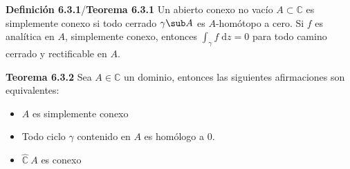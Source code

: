 \documentclass[a4paper, 11pt]{extarticle}
\newcommand{\tma}[1]{\textcolor{rojo}{\textbf{Teorema #1}}}
\newcommand{\defi}[1]{\textcolor{azul}{\textbf{Definición #1}}}
\begin{document}
\begin{multicols*}{2}
\defi{6.3.1}/\tma{6.3.1} Un abierto conexo no vacío \(A \subset \mathbb{C}\) es
simplemente conexo si todo cerrado \(\gamma \sub A\) es \(A\)-homótopo a
cero.
Si \(f\) es analítica en \(A\), simplemente conexo, entonces \(\int _\gamma
f \; \text{d} z = 0\) para todo camino cerrado y rectificable en \(A\).

\tma{6.3.2} Sea \(A \in \mathbb{C}\) un dominio, entonces las siguientes
afirmaciones son equivalentes:
\vspace{-1em}
\begin{itemize}
\item \(A\) es simplemente conexo
\item Todo ciclo \(\gamma\) contenido en \(A\) es homólogo a 0.
\item \(\hat{\mathbb{C}} \ A\) es conexo
\end{itemize}

\vspace{-1em}

\end{multicols*}
\end{document}

